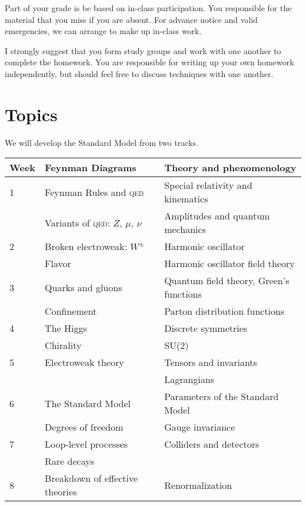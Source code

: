 \documentclass[12pt]{article}
\newcommand{\acro}[1]{\textsc{\MakeLowercase{#1}}}
\numberwithin{equation}{section}    %
\begin{document}
Part of your grade is be based on in-class participation. You responsible for the material that you miss if you are absent. For advance notice and valid emergencies, we can arrange to make up in-class work. 

I strongly suggest that you form study groups and work with one another to complete the homework. You are responsible for writing up your own homework independently, but should feel free to discuss techniques with one another. 

\newpage

\section*{Topics}

We will develop the Standard Model from two tracks.
\vspace{1em} 

\noindent
\begin{tabular}{llll}
	{Week}
	&
	\textbf{Feynman Diagrams} 
	& \hspace{1cm} &
	\textbf{Theory and phenomenology}
	\\
	\hline
	1
	&
	Feynman Rules and \acro{QED}
	&&
	Special relativity and kinematics
	\\
	&
	Variants of \acro{QED}: $Z$, $\mu$, $\nu$
	&&
	Amplitudes and quantum mechanics
	\\
	\hline
	2
	&
	Broken electroweak: $W^\pm$
	&&
	Harmonic oscillator
	\\
	&
	Flavor
	&&
	Harmonic oscillator field theory
	\\
	\hline
	3
	&
	Quarks and gluons
	&&
	Quantum field theory, Green's functions
	\\
	&
	Confinement
	&&
	Parton distribution functions
	\\
	\hline
	4
	&
	The Higgs
	&&
	Discrete symmetries
	\\
	&
	Chirality
	&&
	SU(2)
	\\
	\hline
	5
	&
	Electroweak theory
	&&
	Tensors and invariants
	\\
	&
	
	&&
	Lagrangians
	\\
	\hline
	6
	&
	The Standard Model
	&&
	Parameters of the Standard Model
	\\
	&
	Degrees of freedom
	&&
	Gauge invariance
	\\
	\hline
	7
	&
	Loop-level processes
	&&
	Colliders and detectors
	\\
	&
	Rare decays
	&&
	\\
	\hline
	8
	&
	Breakdown of effective theories
	&&
	Renormalization
\end{tabular}
\vspace{1em}
\noindent 
\end{document}
